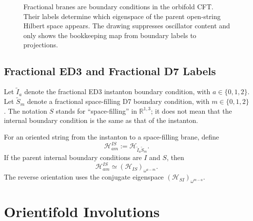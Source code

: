 \documentclass[11pt]{article}
\newcommand{\R}{\mathbb{R}}
\newcommand{\cH}{\mathcal{H}}
\newcommand{\wt}{\widetilde}
\begin{document}
\begin{figure}[ht]
\centering
{}
\caption{Fractional branes are boundary conditions in the orbifold CFT. Their labels determine
which eigenspace of the parent open-string Hilbert space appears. The drawing suppresses
oscillator content and only shows the bookkeeping map from boundary labels to projections.}
\label{fig:fractional-bookkeeping}
\end{figure}

\subsection{Fractional ED3 and Fractional D7 Labels}

Let $\wt I_a$ denote the fractional ED3 instanton boundary condition, with
$a\in\{0,1,2\}$. Let $\wt S_m$ denote a fractional space-filling D7 boundary condition, with
$m\in\{0,1,2\}$. The notation $S$ stands for ``space-filling'' in $\R^{1,3}$; it does not
mean that the internal boundary condition is the same as that of the instanton.

For an oriented string from the instanton to a space-filling brane, define
\begin{equation}
  \cH_{a m}^{I S}
  :=
  \cH_{\wt I_a\wt S_m}.
\end{equation}
If the parent internal boundary conditions are $I$ and $S$, then
\begin{equation}
  \cH_{a m}^{I S}
  \simeq
  \left(\cH_{I S}\right)_{\omega^{a-m}}.
  \label{eq:IS-eigenspace}
\end{equation}
The reverse orientation uses the conjugate eigenspace
$\left(\cH_{S I}\right)_{\omega^{m-a}}$.

\section{Orientifold Involutions}
\end{document}
